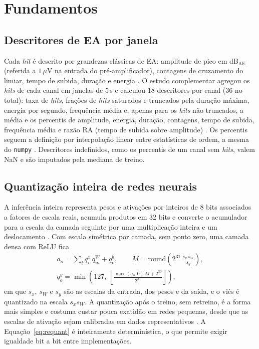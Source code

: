 \documentclass[12pt]{article}
\begin{document}
\section{Fundamentos}
\label{sec:fundamentos}

\subsection{Descritores de EA por janela}

Cada \textit{hit} é descrito por grandezas clássicas de EA: amplitude de pico em dB\(_{\mathrm{AE}}\) (referida a \(1\,\mu\)V na entrada do pré-amplificador), contagens de cruzamento do limiar, tempo de subida, duração e energia \cite{unnthorsson2013}. O estudo complementar agregou os \textit{hits} de cada canal em janelas de 5\,s e calculou 18 descritores por canal (36 no total): taxa de \textit{hits}, frações de \textit{hits} saturados e truncados pela duração máxima, energia por segundo, frequência média e, apenas para os \textit{hits} não truncados, a média e os percentis de amplitude, energia, duração, contagens, tempo de subida, frequência média e razão RA (tempo de subida sobre amplitude) \cite{mlpbomba2026,ohno2010}. Os percentis seguem a definição por interpolação linear entre estatísticas de ordem, a mesma do \texttt{numpy} \cite{hyndman1996}. Descritores indefinidos, como os percentis de um canal sem \textit{hits}, valem NaN e são imputados pela mediana de treino.

\subsection{Quantização inteira de redes neurais}

A inferência inteira representa pesos e ativações por inteiros de 8 bits associados a fatores de escala reais, acumula produtos em 32 bits e converte o acumulador para a escala da camada seguinte por uma multiplicação inteira e um deslocamento \cite{jacob2018,krishnamoorthi2018}. Com escala simétrica por camada, sem ponto zero, uma camada densa com ReLU fica
\begin{equation}
	\begin{gathered}
		a_o = \sum_{i} q^{x}_{i}\, q^{W}_{io} + q^{b}_{o}, \qquad
		M = \mathrm{round}\!\left(2^{31}\,\frac{s_x\, s_W}{s_y}\right), \\
		q^{y}_{o} = \min\!\left(127,\ \left\lfloor \frac{\max(a_o, 0)\, M + 2^{30}}{2^{31}} \right\rfloor\right),
	\end{gathered}
	\label{eq:requant}
\end{equation}
em que \(s_x\), \(s_W\) e \(s_y\) são as escalas da entrada, dos pesos e da saída, e o viés é quantizado na escala \(s_x s_W\). A quantização após o treino, sem retreino, é a forma mais simples e costuma custar pouca exatidão em redes pequenas, desde que as escalas de ativação sejam calibradas em dados representativos \cite{nagel2021}. A Equação~\eqref{eq:requant} é inteiramente determinística, o que permite exigir igualdade bit a bit entre implementações.
\end{document}
